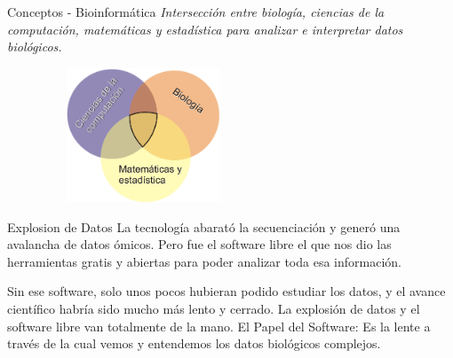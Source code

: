 \documentclass[11pt]{beamer}
\begin{document}
	\begin{frame}{Conceptos - Bioinformática}
		\textit{Intersección entre biología, ciencias de la computación, matemáticas y estadística para analizar e interpretar datos biológicos.}
			\begin{figure}[h!] 
    				\centering
				\includegraphics[width=6cm, height=4cm]{interaccion-de-tres-ciencias-basicas.png}
			\end{figure}
	\end{frame}
	

	\begin{frame}{Explosion de Datos}
La tecnología abarató la secuenciación y generó una avalancha de datos ómicos. Pero fue el software libre el que nos dio las herramientas gratis y abiertas para poder analizar toda esa información.

Sin ese software, solo unos pocos hubieran podido estudiar los datos, y el avance científico habría sido mucho más lento y cerrado. La explosión de datos y el software libre van totalmente de la mano.
El Papel del Software: Es la lente a través de la cual vemos y entendemos los datos biológicos complejos.
	\end{frame}
	
\end{document}
